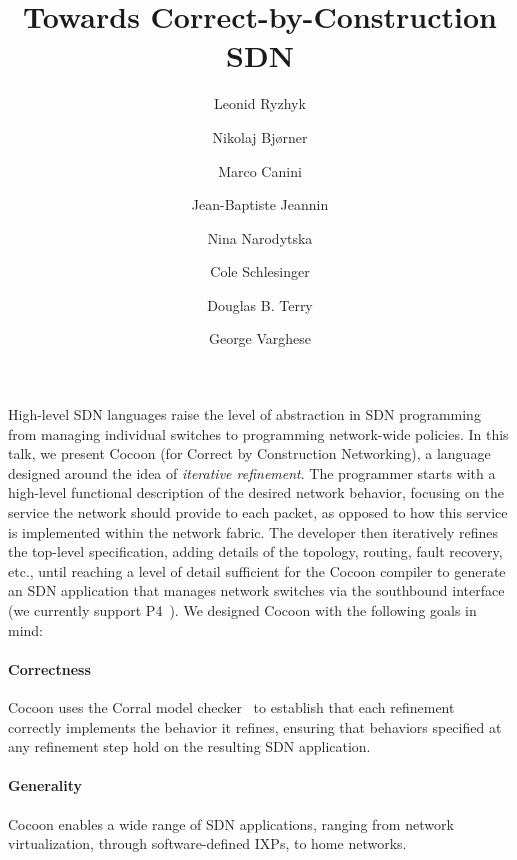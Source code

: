\documentclass[letterpaper,10pt,twocolumn]{article}
\begin{document}
\title{\vspace{-3cm}Towards Correct-by-Construction SDN}

\author[1]{Leonid Ryzhyk}
\author[2]{Nikolaj Bj{\o}rner}
\author[3]{Marco Canini}
\author[1]{Jean-Baptiste Jeannin}
\author[1]{Nina Narodytska}
\author[1]{Cole Schlesinger}
\author[1]{Douglas B. Terry}
\author[2]{George Varghese}


\date{}
\maketitle

High-level SDN languages raise the level of abstraction in SDN 
programming from managing individual switches to programming 
network-wide policies.  In this talk, we present Cocoon (for 
Correct by Construction Networking), a language designed around 
the idea of \emph{iterative refinement}.  The programmer starts 
with a high-level functional description of the desired network 
behavior, focusing on the service the network should provide to 
each packet, as opposed to how this service is implemented within 
the network fabric.  The developer then iteratively refines the 
top-level specification, adding details of the topology, routing, 
fault recovery, etc., until reaching a level of detail sufficient 
for the Cocoon compiler to generate an SDN application that 
manages network switches via the southbound interface (we 
currently support P4~\cite{Bosshart_DGIMRSTVVW_14}).  We designed 
Cocoon with the following goals in mind:

\paragraph{Correctness} Cocoon uses the Corral model 
checker~\cite{Lal_QL_12} to establish that each refinement 
correctly implements the behavior it refines, ensuring that 
behaviors specified at any refinement step hold on the resulting 
SDN application.


\paragraph{Generality} Cocoon enables a wide range of SDN 
applications, ranging from network virtualization, through 
software-defined IXPs, to home networks. 
\end{document}
